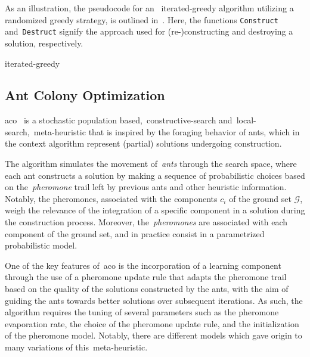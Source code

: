 As an illustration, the pseudocode for an ~\acrshort{iterated-greedy} algorithm
utilizing a randomized greedy strategy, is outlined
in~. Here, the functions \texttt{Construct}
and~\texttt{Destruct} signify the approach used for (re-)constructing and
destroying a solution, respectively.

\begin{algorithm}
  
  \caption{\acrlong{iterated-greedy}}
  \label{algorithm:iterated-greedy}
\end{algorithm}

\subsection{Ant Colony Optimization}
\label{subsec:aco}

\acrfull{aco}~\cite{dorigo2010anta,stutzle1999maxmin,luke2013essentialsa,blum2003metaheuristics}
is a stochastic population based,~\acrshort{constructive-search}
and~\acrshort{local-search},~\acrshort{meta-heuristic} that is inspired by the
foraging behavior of ants, which in the context algorithm represent (partial)
solutions undergoing construction.

The algorithm simulates the movement of~\textit{ants} through the search space,
where each ant constructs a solution by making a sequence of probabilistic
choices based on the~\textit{pheromone} trail left by previous ants and other
heuristic information. Notably, the pheromones, associated with the components
$c_{i}$ of the ground set $\mathcal{G}$, weigh the relevance of the integration
of a specific component in a solution during the construction process.
Moreover, the~\textit{pheromones} are associated with each component of the
ground set, and in practice consist in a parametrized probabilistic model.

One of the key features of~\acrshort{aco} is the incorporation of a learning component
through the use of a pheromone update rule that adapts the pheromone trail based
on the quality of the solutions constructed by the ants, with the aim of guiding
the ants towards better solutions over subsequent iterations. As such, the
algorithm requires the tuning of several parameters such as the pheromone
evaporation rate, the choice of the pheromone update rule, and the
initialization of the pheromone model. Notably, there are different models
which gave origin to many variations of this~\acrshort{meta-heuristic}.

